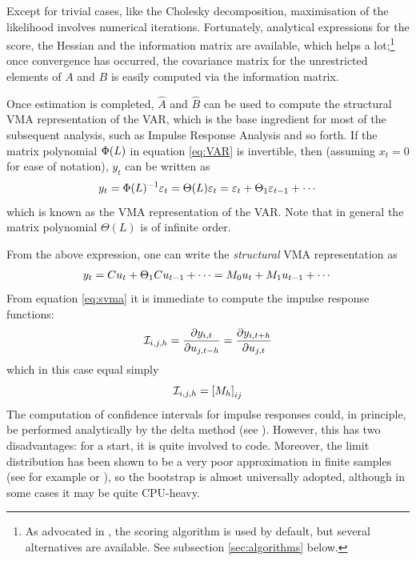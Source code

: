 \documentclass[a4paper,10pt]{article}
\newcommand{\PrE}[1]{\ensuremath \varepsilon_{#1}}
\newcommand{\StS}[1]{\ensuremath u_{#1}}
\newcommand{\VarSym}{\ensuremath \Phi}
\newcommand{\IRF}[1]{\ensuremath \mathcal{I}_{#1}}
\newcommand{\pder}[2]{\ensuremath\frac{\partial #1}{\partial #2}}
\begin{document}
Except for trivial cases, like the Cholesky decomposition,
maximisation of the likelihood involves numerical
iterations. Fortunately, analytical expressions for the score, the
Hessian and the information matrix are available, which helps a
lot;\footnote{As advocated in \citeauthor{AG}, the scoring algorithm
  is used by default, but several alternatives are available. See
  subsection \ref{sec:algorithms} below.} once convergence has
occurred, the covariance matrix for the unrestricted elements of $A$
and $B$ is easily computed via the information matrix.

Once estimation is completed, $\hat{A}$ and $\hat{B}$ can be used to
compute the structural VMA representation of the VAR, which is the
base ingredient for most of the subsequent analysis, such as Impulse
Response Analysis and so forth. If the matrix polynomial $\VarSym(L)$ in
equation \eqref{eq:VAR} is invertible, then (assuming $x_t=0$ for ease of
notation), $y_t$ can be written as
\begin{equation}
  \label{eq:vma}
y_t = \VarSym(L)^{-1}\PrE{t} = \Theta(L) \PrE{t} = \PrE{t} + \Theta_1
\PrE{t-1} + \cdots
\end{equation}
which is known as the VMA representation of the VAR. Note that in
general the matrix polynomial $\Theta(L)$ is of infinite order.

From the above expression, one can write the \emph{structural} VMA
representation as
\begin{equation}
  \label{eq:svma}
  y_t = C \StS{t} + \Theta_1 C \StS{t-1}  + \cdots 
      = M_0 \StS{t} + M_1 \StS{t-1}  + \cdots 
\end{equation}
From equation \eqref{eq:svma} it is immediate to compute the impulse response
functions:
\begin{equation}
  \label{eq:IRFdef}
  \IRF{i,j,h} = \pder{y_{i,t}}{\StS{j, t-h}} = \pder{y_{i,t+h}}{\StS{j, t}} 
\end{equation}
which in this case equal simply
\[
  \IRF{i,j,h} = \left[ M_h \right]_{ij}
\]
The computation of confidence intervals for impulse responses could,
in principle, be performed analytically by the delta method (see
\cite{Lut90}). However, this has two disadvantages: for a start, it is
quite involved to code. Moreover, the limit distribution has been
shown to be a very poor approximation in finite samples (see for
example \cite{FaBra96} or \cite{Kilian98}), so the bootstrap is almost
universally adopted, although in some cases it may be quite CPU-heavy.

\end{document}
